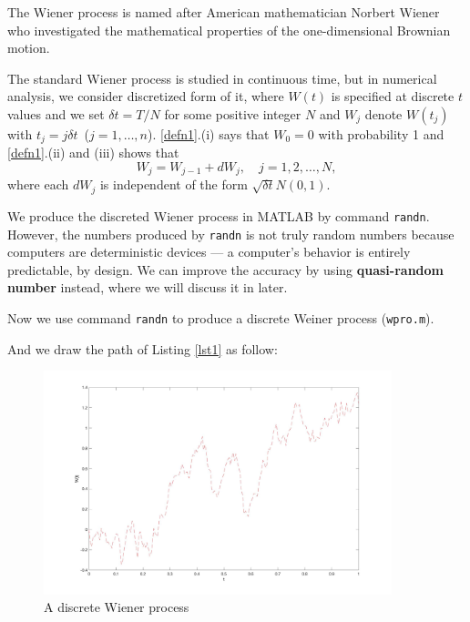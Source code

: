\documentclass[12pt,a4paper]{article}
\theoremstyle{definition}
\begin{document}
The Wiener process is named after American mathematician Norbert Wiener who investigated the mathematical properties of the one-dimensional Brownian motion. 

The standard Wiener process is studied in continuous time, but in numerical analysis, we consider discretized form of it, where $W(t)$ is specified at discrete $t$ values and we set $\delta t=T/N$ for some positive integer $N$ and $W_j$ denote $W(t_j)$ with $t_j=j\delta t$\ ($j=1,\dots, n$). \ref{defn1}.(i) says that $W_0=0$ with probability 1 and \ref{defn1}.(ii) and (iii) shows that \begin{equation}
    \label{2.1}
    W_j=W_{j-1}+dW_j,\quad j=1,2,\dots,N,
\end{equation}
where each $dW_j$ is independent of the form $\sqrt{\delta t} N(0,1)$.\cite{higham._2001}

We produce the discreted Wiener process in MATLAB by command \verb|randn|. However, the numbers produced by \verb|randn| is not truly random numbers because computers are deterministic devices — a computer's behavior is entirely predictable, by design\cite{computer}. We can improve the accuracy by using \textbf{quasi-random number} instead\cite{sauer}\cite{matlab-quasi}, where we will discuss it in later. 

Now we use command \verb|randn| to produce a discrete Weiner process (\verb|wpro.m|). 



And we draw the path of Listing \ref{lst1} as follow:
\begin{figure}[htbp]
\centering
\includegraphics[width=0.9\textwidth]{fig/fig1.jpg}
\caption{\label{fig1}A discrete Wiener process}
\end{figure}
\end{document}

